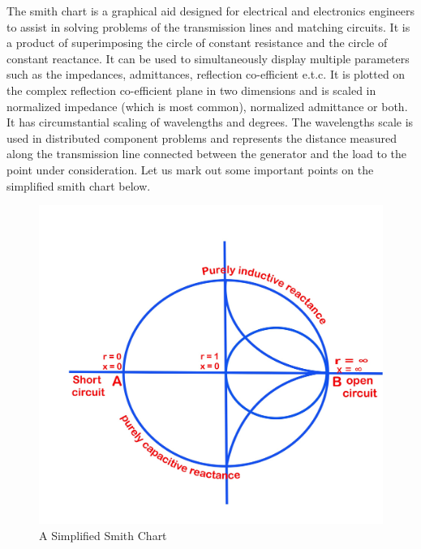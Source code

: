The smith chart is a graphical aid designed for electrical and electronics engineers to assist in solving problems of the transmission lines and matching circuits. It is a product of superimposing the circle of constant resistance and the circle of constant reactance. It can be used to simultaneously display multiple parameters such as the impedances, admittances, reflection co-efficient e.t.c.
It is plotted on the complex reflection co-efficient plane in two dimensions and is scaled in normalized impedance (which is most common), normalized admittance or both. It has circumstantial scaling of wavelengths and degrees. The wavelengths scale is used in distributed component problems and represents the distance measured along the transmission line connected between the generator and the load to the point under consideration.
Let us mark out some important points on the simplified smith chart below.
\begin{figure}[h]
\centering
\includegraphics[width=0.5\linewidth]{"./graphics/473 drawingjhgfd"}
\caption{A Simplified Smith Chart}
\label{fig:473-drawingjhgfd}
\end{figure}

